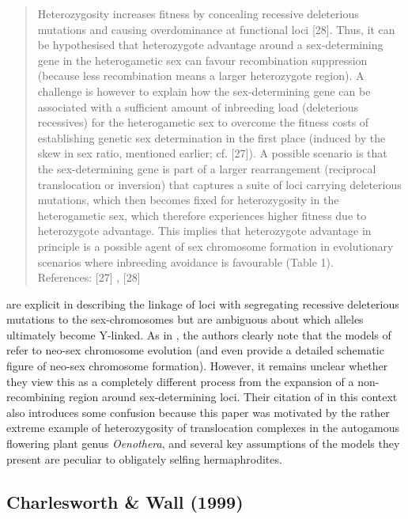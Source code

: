 \documentclass{article}
\begin{document}
\begin{appendices}
	\begin{quote}
		Heterozygosity increases fitness by concealing recessive deleterious mutations and causing overdominance at functional loci [28]. Thus, it can be hypothesised that heterozygote advantage around a sex-determining gene in the heterogametic sex can favour recombination suppression (because less recombination means a larger heterozygote region). A challenge is however to explain how the sex-determining gene can be associated with a sufficient amount of inbreeding load (deleterious recessives) for the heterogametic sex to overcome the fitness costs of establishing genetic sex determination in the first place (induced by the skew in sex ratio, mentioned earlier; cf. [27]). A possible scenario is that the sex-determining gene is part of a larger rearrangement (reciprocal translocation or inversion) that captures a suite of loci carrying deleterious mutations, which then becomes fixed for heterozygosity in the heterogametic sex, which therefore experiences higher fitness due to heterozygote advantage. This implies that heterozygote advantage in principle is a possible agent of sex chromosome formation in evolutionary scenarios where inbreeding avoidance is favourable (Table 1).\\
		\footnotesize{References: [27] \citet{deWaalMaleFijtCharlesworth1979}, [28] \citet{CharlesworthWall1999}}
	\end{quote}

\noindent \citet{Ponnikas2018} are explicit in describing the linkage of loci with segregating recessive deleterious mutations to the sex-chromosomes but are ambiguous about which alleles ultimately become Y-linked. As in \citet{Ironside2010}, the authors clearly note that the models of \citet{CharlesworthWall1999} refer to neo-sex chromosome evolution (and even provide a detailed schematic figure of neo-sex chromosome formation). However, it remains unclear whether they view this as a completely different process from the expansion of a non-recombining region around sex-determining loci. Their citation of \citet{deWaalMaleFijtCharlesworth1979} in this context also introduces some confusion because this paper was motivated by the rather extreme example of heterozygosity of translocation complexes in the autogamous flowering plant genus {\itshape Oenothera}, and several key assumptions of the models they present are peculiar to obligately selfing hermaphrodites. 


\subsection*{Charlesworth \& Wall (1999)}


\end{appendices}
\end{document}
